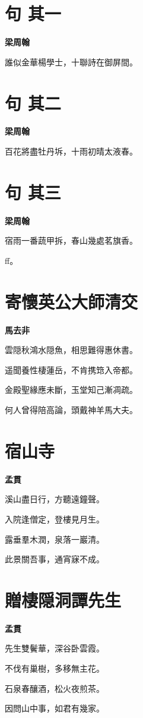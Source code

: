 \documentclass[12pt,a4paper]{ctexbook}
\begin{document}
\section{句  其一}
\textbf{梁周翰}\par\vspace{0.5em}
誰似金華楊學士，十聯詩在御屏間。\par

\section{句  其二}
\textbf{梁周翰}\par\vspace{0.5em}
百花將盡牡丹坼，十雨初晴太液春。\par

\section{句  其三}
\textbf{梁周翰}\par\vspace{0.5em}
宿雨一番蔬甲拆，春山幾處茗旗香。\par
ff。\par

\section{寄懷英公大師清交}
\textbf{馬去非}\par\vspace{0.5em}
雲隠秋鴻水隠魚，相思難得惠休書。\par
遥聞養性棲蓮岳，不肯携筇入帝都。\par
金殿聖緣應未斷，玉堂知己漸凋疏。\par
何人曾得陪高論，頭戴神羊馬大夫。\par

\section{宿山寺}
\textbf{孟貫}\par\vspace{0.5em}
溪山盡日行，方聽遠鐘聲。\par
入院逢僧定，登樓見月生。\par
露垂羣木潤，泉落一巖清。\par
此景關吾事，通宵寐不成。\par

\section{贈棲隠洞譚先生}
\textbf{孟貫}\par\vspace{0.5em}
先生雙鬢華，深谷卧雲霞。\par
不伐有巢樹，多移無主花。\par
石泉春釀酒，松火夜煎茶。\par
因問山中事，如君有幾家。\par
\end{document}
